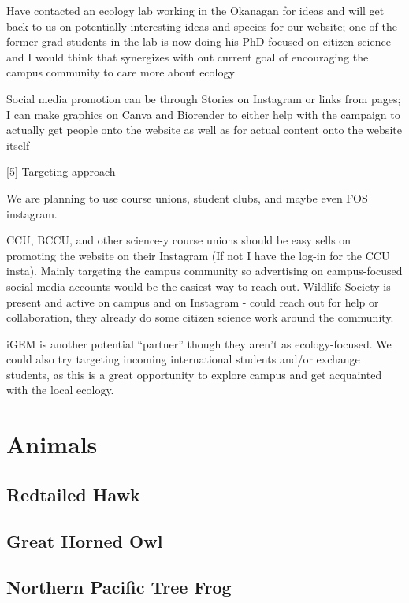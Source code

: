 \documentclass[
]{book}
\begin{document}
Have contacted an ecology lab working in the Okanagan for ideas and will get back to us on potentially interesting ideas and species for our website; one of the former grad students in the lab is now doing his PhD focused on citizen science and I would think that synergizes with out current goal of encouraging the campus community to care more about ecology

Social media promotion can be through Stories on Instagram or links from pages; I can make graphics on Canva and Biorender to either help with the campaign to actually get people onto the website as well as for actual content onto the website itself

{{[}5{]} Targeting approach}

We are planning to use course unions, student clubs, and maybe even FOS instagram.

CCU, BCCU, and other science-y course unions should be easy sells on promoting the website on their Instagram (If not I have the log-in for the CCU insta). Mainly targeting the campus community so advertising on campus-focused social media accounts would be the easiest way to reach out. Wildlife Society is present and active on campus and on Instagram - could reach out for help or collaboration, they already do some citizen science work around the community.

iGEM is another potential ``partner'' though they aren't as ecology-focused. We could also try targeting incoming international students and/or exchange students, as this is a great opportunity to explore campus and get acquainted with the local ecology.

\hypertarget{animals}{%
\chapter{Animals}\label{animals}}

\hypertarget{redtailed-hawk}{%
\section{Redtailed Hawk}\label{redtailed-hawk}}

\hypertarget{great-horned-owl}{%
\section{Great Horned Owl}\label{great-horned-owl}}

\hypertarget{northern-pacific-tree-frog}{%
\section{Northern Pacific Tree Frog}\label{northern-pacific-tree-frog}}
\end{document}
